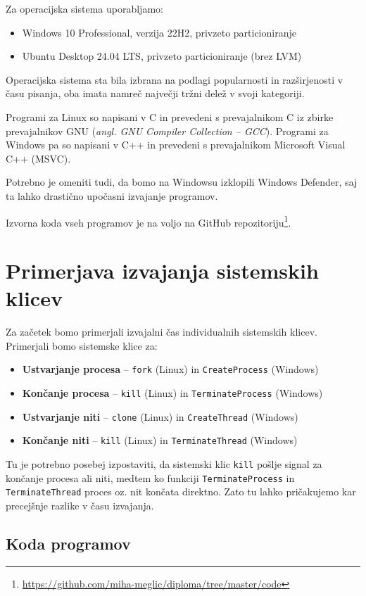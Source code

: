 \documentclass[a4paper,12pt,openright]{book}
\begin{document}
Za operacijska sistema uporabljamo:
\begin{itemize}
	\item Windows 10 Professional, verzija 22H2, privzeto particioniranje
	\item Ubuntu Desktop 24.04 LTS, privzeto particioniranje (brez LVM)
\end{itemize}
Operacijska sistema sta bila izbrana na podlagi popularnosti in razširjenosti v času pisanja, oba imata namreč največji tržni delež v svoji kategoriji.

Programi za Linux so napisani v C in prevedeni s prevajalnikom C iz zbirke prevajalnikov GNU (\textit{angl. GNU Compiler Collection -- GCC}).
Programi za Windows pa so napisani v C++ in prevedeni s prevajalnikom Microsoft Visual C++ (MSVC).

Potrebno je omeniti tudi, da bomo na Windowsu izklopili Windows Defender, saj ta lahko drastično upočasni izvajanje programov.

Izvorna koda vseh programov je na voljo na GitHub repozitoriju\footnote{\url{https://github.com/miha-meglic/diploma/tree/master/code}}.

\section{Primerjava izvajanja sistemskih klicev}

Za začetek bomo primerjali izvajalni čas individualnih sistemskih klicev.
Primerjali bomo sistemske klice za:
\begin{itemize}
	\item \textbf{Ustvarjanje procesa} -- \texttt{fork} (Linux) in \texttt{CreateProcess} (Windows)
	\item \textbf{Končanje procesa} -- \texttt{kill} (Linux) in \texttt{TerminateProcess} (Windows)
	\item \textbf{Ustvarjanje niti} -- \texttt{clone} (Linux) in \texttt{CreateThread} (Windows)
	\item \textbf{Končanje niti} -- \texttt{kill} (Linux) in \texttt{TerminateThread} (Windows)
\end{itemize}

Tu je potrebno posebej izpostaviti, da sistemski klic \texttt{kill} pošlje signal za končanje procesa ali niti, medtem ko funkciji \texttt{TerminateProcess} in \texttt{Terminate\-Thread} proces oz. nit končata direktno.
Zato tu lahko pričakujemo kar precejšnje razlike v času izvajanja.

\subsection{Koda programov}
\end{document}

